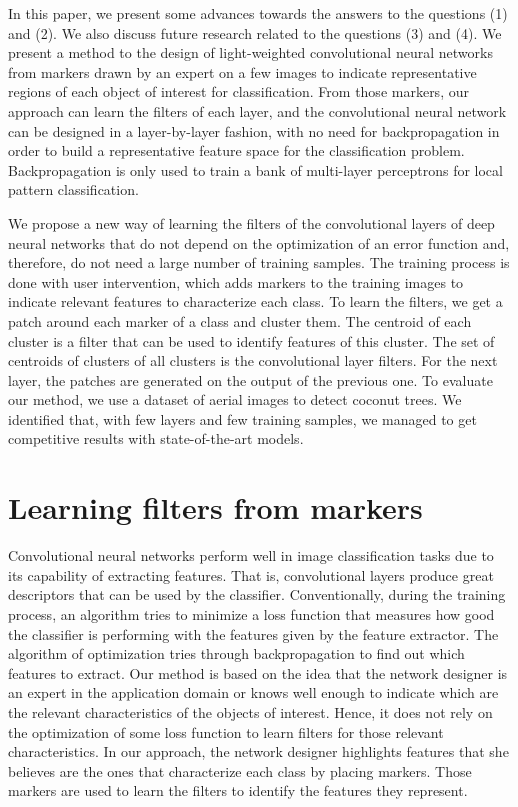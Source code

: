 \documentclass[a4paper,conference]{IEEEtran}
\begin{document}
In this paper, we present some advances towards the answers to the questions (1) and (2). We also discuss future research related to the questions (3) and (4). We present a method to the design of light-weighted convolutional neural networks from markers drawn by an expert on a few images to indicate representative regions of each object of interest for classification. From those markers, our approach can learn the filters of each layer, and the convolutional neural network can be designed in a layer-by-layer fashion, with no need for backpropagation in order to build a representative feature space for the classification problem. Backpropagation is only used to train a bank of multi-layer perceptrons for local pattern classification.

We propose a new way of learning the filters of the convolutional layers of deep neural networks that do not depend on the optimization of an error function and, therefore, do not need a large number of training samples. The training process is done with user intervention, which adds markers to the training images to indicate relevant features to characterize each class. To learn the filters, we get a patch around each marker of a class and cluster them. The centroid of each cluster is a filter that can be used to identify features of this cluster. The set of centroids of clusters of all clusters is the convolutional layer filters. For the next layer, the patches are generated on the output of the previous one. To evaluate our method, we use a dataset of aerial images to detect coconut trees. We identified that, with few layers and few training samples, we managed to get competitive results with state-of-the-art models.

\section{Learning filters from markers}
\label{sec:method}

Convolutional neural networks perform well in image classification tasks due to its capability of extracting features. That is, convolutional layers produce great descriptors that can be used by the classifier. Conventionally, during the training process, an algorithm tries to minimize a loss function that measures how good the classifier is performing with the features given by the feature extractor. The algorithm of optimization tries through backpropagation to find out which features to extract. Our method is based on the idea that the network designer is an expert in the application domain or knows well enough to indicate which are the relevant characteristics of the objects of interest. Hence, it does not rely on the optimization of some loss function to learn filters for those relevant characteristics. In our approach, the network designer highlights features that she believes are the ones that characterize each class by placing markers. Those markers are used to learn the filters to identify the features they represent.
\end{document}

